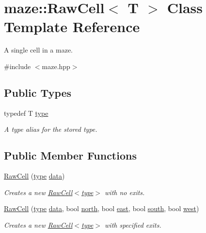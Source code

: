 \hypertarget{classmaze_1_1RawCell}{}\section{maze\+:\+:Raw\+Cell$<$ T $>$ Class Template Reference}
\label{classmaze_1_1RawCell}


A single cell in a maze.  




{\ttfamily \#include $<$maze.\+hpp$>$}

\subsection*{Public Types}
\begin{DoxyCompactItemize}
\item 
\mbox{\label{classmaze_1_1RawCell_afa8fb78a3cb15c45b86c391f2e821ee5}} 
typedef T \hyperlink{classmaze_1_1RawCell_afa8fb78a3cb15c45b86c391f2e821ee5}{type}
\begin{DoxyCompactList}\small\item\em A type alias for the stored type. \end{DoxyCompactList}\end{DoxyCompactItemize}
\subsection*{Public Member Functions}
\begin{DoxyCompactItemize}
\item 
\mbox{\label{classmaze_1_1RawCell_aabcb711ffb2b40524313ea274044a3db}} 
\hyperlink{classmaze_1_1RawCell_aabcb711ffb2b40524313ea274044a3db}{Raw\+Cell} (\hyperlink{classmaze_1_1RawCell_afa8fb78a3cb15c45b86c391f2e821ee5}{type} \hyperlink{classmaze_1_1RawCell_ab53141e2127b27d217709977d6bf720c}{data})
\begin{DoxyCompactList}\small\item\em Creates a new \hyperlink{classmaze_1_1RawCell}{Raw\+Cell$<$type$>$} with no exits. \end{DoxyCompactList}\item 
\mbox{\label{classmaze_1_1RawCell_a3afb3e58715ce01011ab24d8a4f2f5f6}} 
\hyperlink{classmaze_1_1RawCell_a3afb3e58715ce01011ab24d8a4f2f5f6}{Raw\+Cell} (\hyperlink{classmaze_1_1RawCell_afa8fb78a3cb15c45b86c391f2e821ee5}{type} \hyperlink{classmaze_1_1RawCell_ab53141e2127b27d217709977d6bf720c}{data}, bool \hyperlink{classmaze_1_1RawCell_afb8695c6c64f2c94eaa5b27453261452}{north}, bool \hyperlink{classmaze_1_1RawCell_a01804787461c5ae6aac0460a0170d6d9}{east}, bool \hyperlink{classmaze_1_1RawCell_adefd71aa8e04a6dd4fa7b9d788a2da24}{south}, bool \hyperlink{classmaze_1_1RawCell_a02eea7dcdf8ff0708b71d2c95ed928e1}{west})
\begin{DoxyCompactList}\small\item\em Creates a new \hyperlink{classmaze_1_1RawCell}{Raw\+Cell$<$type$>$} with specified exits. \end{DoxyCompactList}\end{DoxyCompactItemize}
